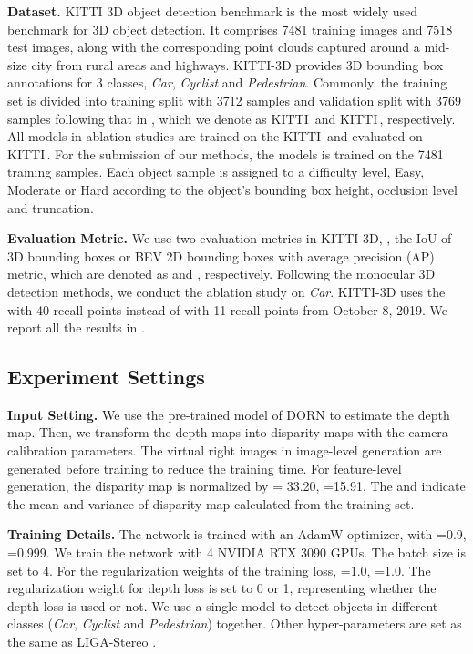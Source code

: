 \documentclass[10pt,twocolumn,letterpaper]{article}
\begin{document}
\noindent\textbf{Dataset.} KITTI 3D object detection benchmark \cite{KITTI} is the most widely used benchmark for 3D object detection. It comprises 7481 training images and 7518 test images, along with the corresponding point clouds captured around a mid-size city from rural areas and highways. 
KITTI-3D provides 3D bounding box annotations for 3 classes, \emph{Car}, \emph{Cyclist} and \emph{Pedestrian}.
Commonly, the training set is divided into training split with 3712 samples and validation split with 3769 samples following that in \cite{ding2019learning}, which we denote as KITTI\, and KITTI\,, respectively. All models in ablation studies are trained on the KITTI\, and evaluated on KITTI\,. For the submission of our methods, the models is trained on the 7481 training samples.
Each object sample is assigned to a difficulty level, Easy, Moderate or Hard according to the object's bounding box height, occlusion level and truncation. 


\noindent\textbf{Evaluation Metric.} We use two evaluation metrics in KITTI-3D, , the IoU of 3D bounding boxes or BEV 2D bounding boxes with average precision (AP) metric, which are denoted as  and , respectively. Following the monocular 3D detection methods\cite{ding2019learning, barabanau2019monocular, MonoFlex}, we conduct the ablation study on \emph{Car}. KITTI-3D uses the  with 40 recall points instead of  with 11 recall points from October 8, 2019. We report all the results in .
\subsection{Experiment Settings}
\noindent\textbf{Input Setting.} We use the pre-trained model of DORN \cite{DORN} to estimate the depth map. Then, we transform the depth maps into disparity maps with the camera calibration parameters. The virtual right images in image-level generation are generated before training to reduce the training time. For feature-level generation, the disparity map is normalized by = 33.20, =15.91. The  and  indicate the mean and variance of disparity map calculated from the training set.

\noindent\textbf{Training Details.} The network is trained with an AdamW \cite{loshchilov2017decoupled} optimizer, with =0.9, =0.999. We train the network with 4 NVIDIA RTX 3090 GPUs. The batch size is set to 4. For the regularization weights of the training loss, =1.0, =1.0. The regularization weight  for depth loss  is set to 0 or 1, representing whether the depth loss is used or not. We use a single model to detect objects in different classes (\emph{Car}, \emph{Cyclist} and \emph{Pedestrian}) together. Other hyper-parameters are set as the same as LIGA-Stereo \cite{guo2021liga}. 
\end{document}

